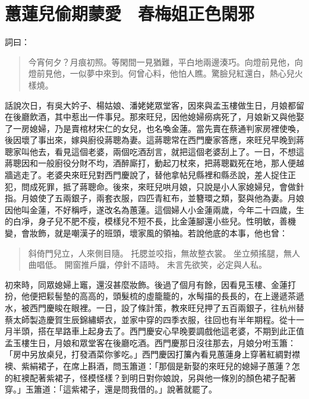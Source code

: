 
\chapter{蕙蓮兒偷期蒙愛　春梅姐正色閑邪}

詞曰：
\begin{quote}
今宵何夕？月痕初照。等閑間一見猶難，平白地兩邊湊巧。向燈前見他，向燈前見他，一似夢中來到。何曾心料，他怕人瞧。驚臉兒紅還白，熱心兒火樣燒。
\end{quote}

話說次日，有吳大妗子、楊姑娘、潘姥姥眾堂客，因來與孟玉樓做生日，月娘都留在後廳飲酒，其中惹出一件事兒。那來旺兒，因他媳婦癆病死了，月娘新又與他娶了一房媳婦，乃是賣棺材宋仁的女兒，也名喚金蓮。當先賣在蔡通判家房裡使喚，後因壞了事出來，嫁與廚役蔣聰為妻。這蔣聰常在西門慶家答應，來旺兒早晚到蔣聰家叫他去，看見這個老婆，兩個吃酒刮言，就把這個老婆刮上了。一日，不想這蔣聰因和一般廚役分財不均，酒醉廝打，動起刀杖來，把蔣聰戳死在地，那人便越牆逃走了。老婆央來旺兒對西門慶說了，替他拿帖兒縣裡和縣丞說，差人捉住正犯，問成死罪，抵了蔣聰命。後來，來旺兒哄月娘，只說是小人家媳婦兒，會做針指。月娘使了五兩銀子，兩套衣服，四匹青紅布，並簪環之類，娶與他為妻。月娘因他叫金蓮，不好稱呼，遂改名為蕙蓮。這個婦人小金蓮兩歲，今年二十四歲，生的白凈，身子兒不肥不瘦，模樣兒不短不長，比金蓮腳還小些兒。性明敏，善機變，會妝飾，就是嘲漢子的班頭，壞家風的領袖。若說他底的本事，他也曾：
\begin{quote}
斜倚門兒立，人來側目隨。
托腮並咬指，無故整衣裳。
坐立頻搖腿，無人曲唱低。
開窗推戶牖，停針不語時。
未言先欲笑，必定與人私。
\end{quote}

初來時，同眾媳婦上竈，還沒甚麼妝飾。後過了個月有餘，因看見玉樓、金蓮打扮，他便把鬏髻墊的高高的，頭髮梳的虛籠籠的，水髩描的長長的，在上邊遞茶遞水，被西門慶睃在眼裡。一日，設了條計策，教來旺兒押了五百兩銀子，往杭州替蔡太師製造慶賀生辰錦繡蟒衣，並家中穿的四季衣服，往回也有半年期程。從十一月半頭，搭在旱路車上起身去了。西門慶安心早晚要調戲他這老婆，不期到此正值孟玉樓生日，月娘和眾堂客在後廳吃酒。西門慶那日沒往那去，月娘分咐玉簫：「房中另放桌兒，打發酒菜你爹吃。」西門慶因打簾內看見蕙蓮身上穿著紅綢對襟襖、紫絹裙子，在席上斟酒，問玉簫道：「那個是新娶的來旺兒的媳婦子蕙蓮？怎的紅襖配著紫裙子，怪模怪樣？到明日對你娘說，另與他一條別的顏色裙子配著穿。」玉簫道：「這紫裙子，還是問我借的。」說著就罷了。

